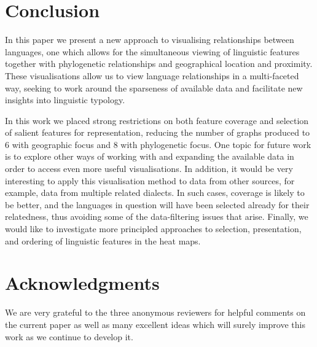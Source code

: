 \documentclass[11pt]{article}
\begin{document}
%
%
%


\section{Conclusion}
In this paper we present a new approach to visualising relationships between languages, one which allows for the simultaneous viewing of linguistic features together with phylogenetic relationships and geographical location and proximity. These visualisations allow us to view language relationships in a multi-faceted way, seeking to work around the sparseness of available data and facilitate new insights into linguistic typology.

In this work we placed strong restrictions on both feature coverage and selection of salient features for representation, reducing the number of graphs produced to 6 with geographic focus and 8 with phylogenetic focus. One topic for future work is to explore other ways of working with and expanding the available data in order to access even more useful visualisations. In addition, it would be very interesting to apply this visualisation method to data from other sources, for example, data from multiple related dialects. In such cases, coverage is likely to be better, and the languages in question will have been selected already for their relatedness, thus avoiding some of the data-filtering issues that arise. Finally, we would like to investigate more principled approaches to selection, presentation, and ordering of linguistic features in the heat maps. 

\section*{Acknowledgments}
We are very grateful to the three anonymous reviewers for helpful comments on the current paper as well as many excellent ideas which will surely improve this work as we continue to develop it. 



\end{document}
